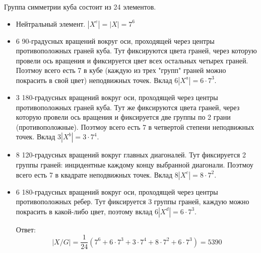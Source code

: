 \documentclass[russian]{article}
\begin{document}
Группа симметрии куба состоит из 24 элементов.
\begin{itemize}
\item Нейтральный элемент. $|X^e| = |X| = 7^6$

\item 6 90-градусных вращений вокруг оси, проходящей через центры противоположных граней куба. Тут фиксируются цвета граней, через которую провели ось вращения и фиксируется цвет всех остальных четырех граней. Поэтмоу всего есть 7 в кубе (каждую из трех "групп" граней можно покрасить в свой цвет) неподвижных точек. Вклад $6 |X^a| = 6 \cdot 7^3$.

\item 3 180-градусных вращений вокруг оси, проходящей через центры противоположных граней куба. Тут же фиксируются цвета граней, через которую провели ось вращения и фиксируется две группы по 2 грани (противоположные). Поэтмоу всего есть 7 в четвертой степени неподвижных точек. Вклад $3 |X^b| = 3 \cdot 7^4$.

\item 8 120-градусных вращений вокруг главных диагоналей. Тут фиксируется 2 группы граней: инцидентные каждому концу выбранной диагонали. Поэтмоу всего есть 7 в квадрате неподвижных точек. Вклад $8 |X^c| = 8 \cdot 7^2$.

\item 6 180-градусных вращений вокруг оси, проходящей через центры противоположных ребер. Тут фиксируется 3 группы граней, каждую можно покрасить в какой-либо цвет, поэтому вклад $6 |X^d| = 6 \cdot 7^3$.

Ответ:
\[
|X/G| = \frac{1}{24}\left(7^6 + 6 \cdot 7^3 + 3 \cdot 7^4 + 8 \cdot 7^2 + 6 \cdot 7^3 \right) = 5390
\]

\end{itemize}
\end{document}
